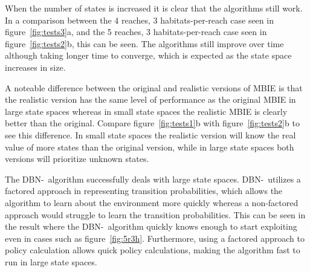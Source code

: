 When the number of states is increased it is clear that the algorithms still
work. In a comparison between the 4 reaches, 3 habitats-per-reach case seen in
figure~\ref{fig:tests3}a, and the 5 reaches, 3 habitats-per-reach case seen
in figure~\ref{fig:tests2}b, this can be seen. The algorithms still improve
over time although taking longer time to converge, which is expected as the
state space increases in size. 

A noteable difference between the original and realistic versions of MBIE is
that the realistic version has the same level of performance as the original
MBIE in large state spaces whereas in small state spaces the realistic MBIE
is clearly better than the original. Compare figure~\ref{fig:tests1}b with
figure~\ref{fig:tests2}b to see this difference. In small state spaces the
realistic version will know the real value of more states than the original
version, while in large state spaces both versions will prioritize unknown
states.

The DBN-\etre\ algorithm successfully deals with large state spaces. DBN-\etre\
utilizes a factored approach in representing transition probabilities, which
allows the algorithm to learn about the environment more quickly whereas a
non-factored approach would struggle to learn the transition probabilities.
This can be seen in the result where the DBN-\etre\ algorithm quickly knows
enough to start exploiting even in cases such as figure~\ref{fig:5r3h}.
Furthermore, using a factored approach to policy calculation allows quick
policy calculations, making the algorithm fast to run in large state spaces.
